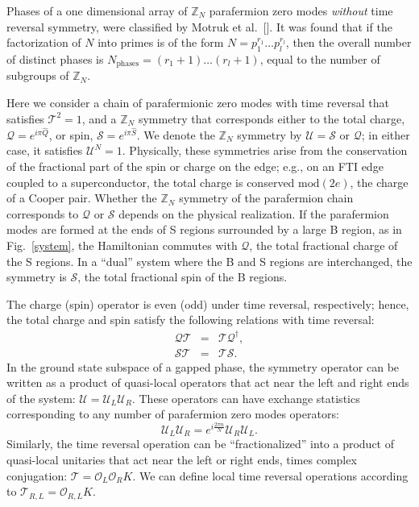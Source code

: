 \documentclass[twocolumn,aps,prb,showpacs]{revtex4-1}
\begin{document}
Phases of a one dimensional array of $\mathbb{Z}_N$ parafermion zero modes \emph{without} time reversal symmetry,  were classified by Motruk et al.~[]. It was found that if the factorization of $N$ into primes is of the form $N = p_1^{r_1} \dots p_l^{r_l}$, then the overall number of distinct phases is $N_{\mathrm{phases}} =  (r_1+1) \dots (r_l+1)$, equal to the number of subgroups of $\mathbb{Z}_N$.

Here we consider a chain of parafermionic zero modes with time reversal that satisfies
$\mathcal{T}^{2}=1$, and a $\mathbb{Z}_{N}$ symmetry that corresponds either
to the total charge, $\mathcal{Q}=e^{i\pi\hat{Q}}$, or spin, $\mathcal{S}=e^{i\pi\hat{S}}$.
We denote the $\mathbb{Z}_{N}$ symmetry by $\mathcal{U}=\mathcal{S}$ or $\mathcal{Q}$;
in either case, it satisfies $\mathcal{U}^{N}=1$. Physically, these symmetries arise from the conservation of the fractional part of the spin or charge on the edge; e.g., on an FTI edge coupled to a superconductor, the total charge is conserved $\mathrm{mod}(2e)$, the charge of a Cooper pair. Whether the $\mathbb{Z}_N$ symmetry of the parafermion chain corresponds to $\mathcal{Q}$ or $\mathcal{S}$ depends on the physical realization. If the parafermion modes are formed at the ends of S regions surrounded by a large B region, as in Fig.~\ref{system}, the Hamiltonian commutes with $\mathcal{Q}$, the total fractional charge of the S regions. In a ``dual'' system where the B and S regions are interchanged, the symmetry is $\mathcal{S}$, the total fractional spin of the B regions.

The charge (spin)
operator is even (odd) under time reversal, respectively; hence, the
total charge and spin satisfy the following relations with time reversal:
\begin{eqnarray}
\mathcal{Q}\mathcal{T} & = & \mathcal{T\mathcal{Q^{\dagger}}},\label{eq:Q}\\
\mathcal{S}\mathcal{T} & = & \mathcal{T\mathcal{S}}.\label{eq:S}
\end{eqnarray}
In the ground state subspace of a gapped phase, the symmetry operator
can be written as a product of quasi-local operators that act near
the left and right ends of the system: $\mathcal{U}=\mathcal{U}_{L}\mathcal{U}_{R}$.
These operators can have exchange statistics corresponding to any
number of parafermion zero modes operators:
\begin{equation}
\mathcal{U}_{L}\mathcal{U}_{R}=e^{i\frac{2\pi n}{N}}\mathcal{U}_{R}\mathcal{U}_{L}.\label{eq:Uex}
\end{equation}
Similarly, the time reversal operation can be ``fractionalized'' into
a product of quasi-local unitaries that act near the left or right
ends, times complex conjugation: $\mathcal{T}=\mathcal{O}_{L}\mathcal{O}_{R}K$.
We can define local time reversal operations according to $\mathcal{T}_{R,L}=\mathcal{O}_{R,L}K$.
\end{document}
